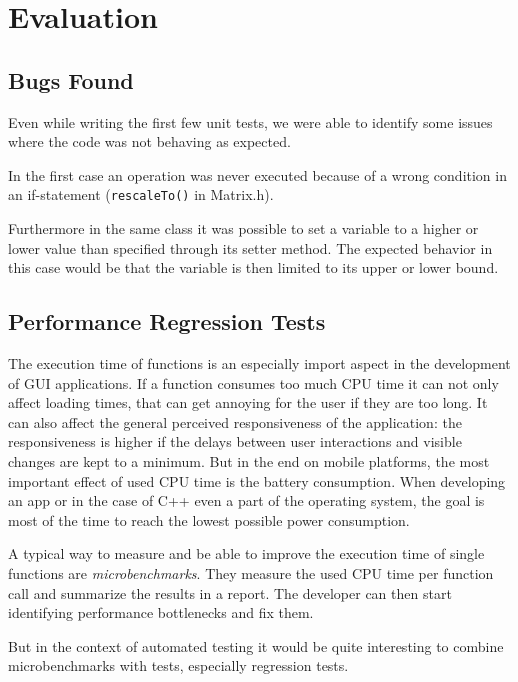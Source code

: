 \documentclass{scrreprt}
\begin{document}

\section{Evaluation}

\subsection{Bugs Found}

Even while writing the first few unit tests, we were able to identify some issues where the code was not behaving as expected.

In the first case an operation was never executed because of a wrong condition in an if-statement (\texttt{rescaleTo()} in Matrix.h).

Furthermore in the same class it was possible to set a variable to a higher or lower value than specified through its setter method. The expected behavior in this case would be that the variable is then limited to its upper or lower bound.

\subsection{Performance Regression Tests}
\label{performance_regression_tests}

The execution time of functions is an especially import aspect in the development of GUI applications. If a function consumes too much CPU time it can not only affect loading times, that can get annoying for the user if they are too long. It can also affect the general perceived responsiveness of the application: the responsiveness is higher if the delays between user interactions and visible changes are kept to a minimum. But in the end on mobile platforms, the most important effect of used CPU time is the battery consumption. When developing an app or in the case of C++ even a part of the operating system, the goal is most of the time to reach the lowest possible power consumption.

A typical way to measure and be able to improve the execution time of single functions are \textit{microbenchmarks}. They measure the used CPU time per function call and summarize the results in a report. The developer can then start identifying performance bottlenecks and fix them.

But in the context of automated testing it would be quite interesting to combine microbenchmarks with tests, especially regression tests.
\end{document}
